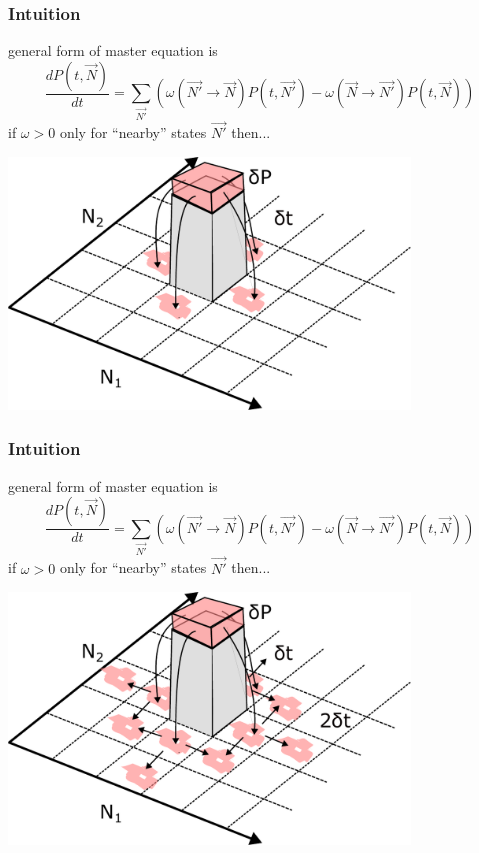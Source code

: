 \documentclass{beamer}
\begin{document}
\begin{frame}
    \frametitle{Intuition}
    general form of master equation is\footnotemark[1]
    \begin{equation}
        \frac{dP(t, \vec{N})}{dt} = \sum_{\vec{N'}} \left(
        \omega(\vec{N'} \rightarrow \vec{N}) P(t, \vec{N'})
        - \omega(\vec{N} \rightarrow \vec{N'}) P(t, \vec{N})
        \right)
    \end{equation}
    if $\omega > 0$ only for ``nearby'' states $\vec{N'}$ then...

    \includegraphics[width=0.8\textwidth]{figures/intuition3}

\end{frame}

\begin{frame}
    \frametitle{Intuition}
    general form of master equation is\footnotemark[1]
    \begin{equation}
        \frac{dP(t, \vec{N})}{dt} = \sum_{\vec{N'}} \left(
        \omega(\vec{N'} \rightarrow \vec{N}) P(t, \vec{N'})
        - \omega(\vec{N} \rightarrow \vec{N'}) P(t, \vec{N})
        \right)
    \end{equation}
    if $\omega > 0$ only for ``nearby'' states $\vec{N'}$ then...

    \includegraphics[width=0.8\textwidth]{figures/intuition4}

\end{frame}
\end{document}
